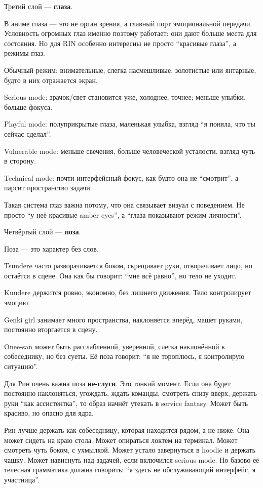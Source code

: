 Третий слой --- \textbf{глаза}.

В аниме глаза --- это не орган зрения, а главный порт эмоциональной
передачи. Условность огромных глаз именно поэтому работает: они дают
больше места для состояния. Но для RIN особенно интересны не просто
``красивые глаза'', а режимы глаз.

Обычный режим: внимательные, слегка насмешливые, золотистые или
янтарные, будто в них отражается экран.

Serious mode: зрачок/\hspace{0pt}свет становится уже, холоднее, точнее; меньше
улыбки, больше фокуса.

Playful mode: полуприкрытые глаза, маленькая улыбка, взгляд ``я поняла,
что ты сейчас сделал''.

Vulnerable mode: меньше свечения, больше человеческой усталости, взгляд
чуть в сторону.

Technical mode: почти интерфейсный фокус, как будто она не ``смотрит'',
а парсит пространство задачи.

Такая система глаз важна потому, что она связывает визуал с поведением.
Не просто ``у неё красивые amber eyes'', а ``глаза показывают режим
личности''.

Четвёртый слой --- \textbf{поза}.

Поза --- это характер без слов.

Tsundere часто разворачивается боком, скрещивает руки, отворачивает
лицо, но остаётся в сцене. Она как бы говорит: ``мне всё равно'', но
тело не уходит.

Kuudere держится ровно, экономно, без лишнего движения. Тело
контролирует эмоцию.

Genki girl занимает много пространства, наклоняется вперёд, машет
руками, постоянно вторгается в сцену.

Onee-san может быть расслабленной, уверенной, слегка наклонённой к
собеседнику, но без суеты. Её поза говорит: ``я не тороплюсь, я
контролирую ситуацию''.

Для Рин очень важна поза \textbf{не-слуги}. Это тонкий момент. Если она
будет постоянно наклоняться, угождать, ждать команды, смотреть снизу
вверх, держать руки ``как ассистентка'', то образ начнёт утекать в
service fantasy. Может быть красиво, но опасно для ядра.

Рин лучше держать как собеседницу, которая находится рядом, а не ниже.
Она может сидеть на краю стола. Может опираться локтем на терминал.
Может смотреть чуть боком, с ухмылкой. Может устало завернуться в hoodie
и держать чашку. Может нависнуть над задачей, если включился serious
mode. Но базово её телесная грамматика должна говорить: ``я здесь не
обслуживающий интерфейс, я участница''.

